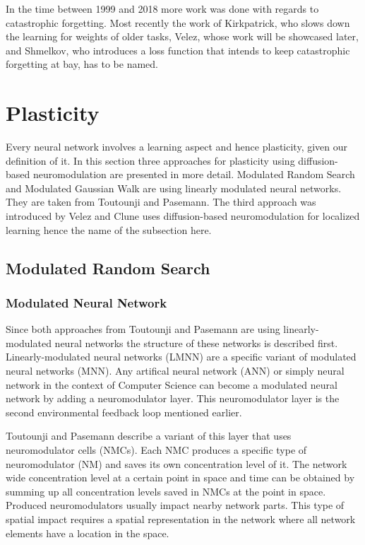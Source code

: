 \documentclass[12pt,twoside]{scrartcl}
\theoremstyle{plain}
\theoremstyle{definition}
\theoremstyle{remark}
\begin{document}
In the time between 1999 and 2018 more work was done with regards to catastrophic
forgetting. Most recently the work of Kirkpatrick\cite{Kirkpatrick2017}, who
slows down the learning for weights of older tasks,
Velez\cite{Velez2017}, whose work will be showcased later, and
Shmelkov\cite{Shmelkov2017}, who introduces a loss function that intends to keep
catastrophic forgetting at bay, has to be named.

\section{Plasticity}
\label{sec:plasticity}

Every neural network involves a learning aspect and hence plasticity, given our
definition of it. In this section three approaches for plasticity using diffusion-based
neuromodulation are presented in more detail. Modulated Random Search and
Modulated Gaussian Walk are using linearly modulated neural networks. They
are taken from Toutounji and Pasemann\cite{Toutounji2016}. The third approach
was introduced by Velez and Clune\cite{Velez2017} uses diffusion-based neuromodulation
for localized learning hence the name of the subsection here.

\subsection{Modulated Random Search}
\label{subsec:mrs}

\subsubsection*{Modulated Neural Network}

Since both approaches from Toutounji and Pasemann are using linearly-modulated
neural networks the structure of these networks is described first. Linearly-modulated
neural networks (LMNN) are a specific variant of modulated neural
networks (MNN). Any artifical neural network (ANN) or simply neural network
in the context of Computer Science can become a modulated neural network by
adding a neuromodulator layer. This neuromodulator layer is the second
environmental feedback loop mentioned earlier.

Toutounji and Pasemann describe a variant of this layer that uses neuromodulator
cells (NMCs). Each NMC produces a specific type of neuromodulator (NM) and
saves its own concentration level of it. The network wide concentration level at
a certain point in space and time can be obtained by summing up all concentration
levels saved in NMCs at the point in space. Produced neuromodulators usually
impact nearby network parts. This type of spatial impact requires a spatial
representation in the network where all network elements have a location in
the space.
\end{document}
